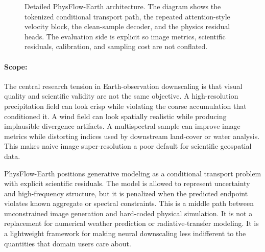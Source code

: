 \documentclass{article}
\makeatletter
\renewcommand{\scriptsize}{\@setfontsize\scriptsize\@viipt\@viiipt}
\renewcommand{\tiny}{\@setfontsize\tiny\@vipt\@viipt}
\makeatother
\begin{document}
\begin{figure}[t]
\caption{Detailed PhysFlow-Earth architecture. The diagram shows the tokenized conditional transport path, the repeated attention-style velocity block, the clean-sample decoder, and the physics residual heads. The evaluation side is explicit so image metrics, scientific residuals, calibration, and sampling cost are not conflated.}
\label{fig:physflow-architecture}
\end{figure}

\paragraph{Scope:}

The central research tension in Earth-observation downscaling is that visual quality and scientific validity are not the same objective. A high-resolution precipitation field can look crisp while violating the coarse accumulation that conditioned it. A wind field can look spatially realistic while producing implausible divergence artifacts. A multispectral sample can improve image metrics while distorting indices used by downstream land-cover or water analysis. This makes naive image super-resolution a poor default for scientific geospatial data.

PhysFlow-Earth positions generative modeling as a conditional transport problem with explicit scientific residuals. The model is allowed to represent uncertainty and high-frequency structure, but it is penalized when the predicted endpoint violates known aggregate or spectral constraints. This is a middle path between unconstrained image generation and hard-coded physical simulation. It is not a replacement for numerical weather prediction or radiative-transfer modeling. It is a lightweight framework for making neural downscaling less indifferent to the quantities that domain users care about.
\end{document}
